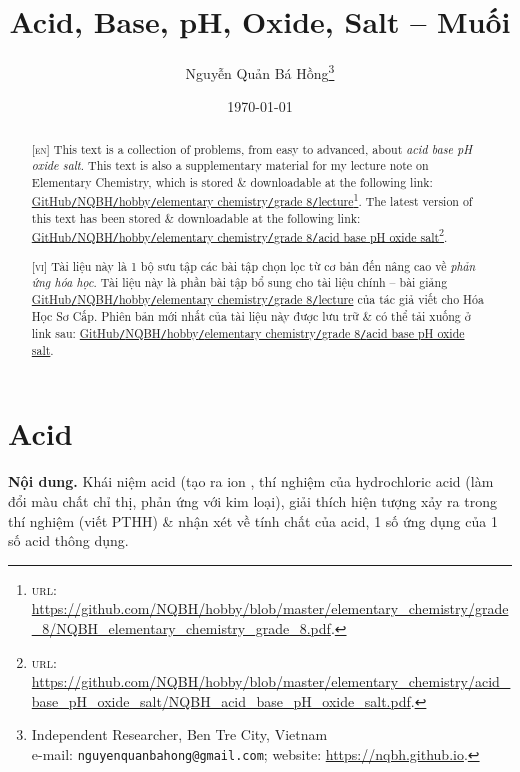 \documentclass{article}
\title{Acid, Base, pH, Oxide, Salt -- Muối}
\author{Nguyễn Quản Bá Hồng\footnote{Independent Researcher, Ben Tre City, Vietnam\\e-mail: \texttt{nguyenquanbahong@gmail.com}; website: \url{https://nqbh.github.io}.}}
\date{\today}
\begin{document}
\maketitle
\begin{abstract}
	\textsc{[en]} This text is a collection of problems, from easy to advanced, about \textit{acid base pH oxide salt}. This text is also a supplementary material for my lecture note on Elementary Chemistry, which is stored \& downloadable at the following link: \href{https://github.com/NQBH/hobby/blob/master/elementary_chemistry/grade_8/NQBH_elementary_chemistry_grade_8.pdf}{GitHub{\tt/}NQBH{\tt/}hobby{\tt/}elementary chemistry{\tt/}grade 8{\tt/}lecture}\footnote{\textsc{url}: \url{https://github.com/NQBH/hobby/blob/master/elementary_chemistry/grade_8/NQBH_elementary_chemistry_grade_8.pdf}.}. The latest version of this text has been stored \& downloadable at the following link: \href{https://github.com/NQBH/hobby/blob/master/elementary_chemistry/acid_base_pH_oxide_salt/NQBH_acid_base_pH_oxide_salt.pdf}{GitHub{\tt/}NQBH{\tt/}hobby{\tt/}elementary chemistry{\tt/}grade 8{\tt/}acid base pH oxide salt}\footnote{\textsc{url}: \url{https://github.com/NQBH/hobby/blob/master/elementary_chemistry/acid_base_pH_oxide_salt/NQBH_acid_base_pH_oxide_salt.pdf}.}.
	\vspace{2mm}
	
	\textsc{[vi]} Tài liệu này là 1 bộ sưu tập các bài tập chọn lọc từ cơ bản đến nâng cao về \textit{phản ứng hóa học}. Tài liệu này là phần bài tập bổ sung cho tài liệu chính -- bài giảng \href{https://github.com/NQBH/hobby/blob/master/elementary_chemistry/grade_8/NQBH_elementary_chemistry_grade_8.pdf}{GitHub{\tt/}NQBH{\tt/}hobby{\tt/}elementary chemistry{\tt/}grade 8{\tt/}lecture} của tác giả viết cho Hóa Học Sơ Cấp. Phiên bản mới nhất của tài liệu này được lưu trữ \& có thể tải xuống ở link sau: \href{https://github.com/NQBH/hobby/blob/master/elementary_chemistry/grade_8/real/NQBH_real.pdf}{GitHub{\tt/}NQBH{\tt/}hobby{\tt/}elementary chemistry{\tt/}grade 8{\tt/}acid base pH oxide salt}.
\end{abstract}
\setcounter{secnumdepth}{4}
\setcounter{tocdepth}{3}
\tableofcontents
\newpage


\section{Acid}
\textsf{\textbf{Nội dung.} Khái niệm acid (tạo ra ion , thí nghiệm của hydrochloric acid (làm đổi màu chất chỉ thị, phản ứng với kim loại), giải thích hiện tượng xảy ra trong thí nghiệm (viết PTHH) \& nhận xét về tính chất của acid, 1 số ứng dụng của 1 số acid thông dụng.}
\end{document}
